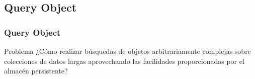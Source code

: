 \documentclass[a4paper,slidestop,xcolor=pst,blue]{beamer}
\begin{document}
\subsection{Query Object}

\begin{frame}[c]
    \frametitle{Query Object}
    \begin{block}{Problema}
        ¿Cómo realizar búsquedas de objetos arbitrariamente complejas sobre colecciones de datos largas aprovechando las facilidades proporcionadas por el almacén persistente?
    \end{block}
\end{frame}

%
\end{document}
